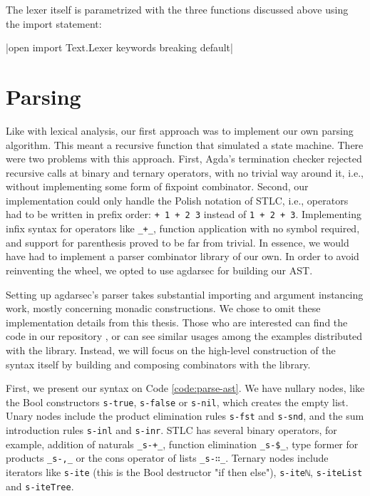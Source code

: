 The lexer itself is parametrized with the three functions discussed above using the import statement:

|open import Text.Lexer keywords breaking default|

\section{Parsing}

Like with lexical analysis, our first approach was to implement our own parsing algorithm. This meant a recursive function that simulated a state machine. There were two problems with this approach. First, Agda's termination checker rejected recursive calls at binary and ternary operators, with no trivial way around it, i.e., without implementing some form of fixpoint combinator. Second, our implementation could only handle the Polish notation of STLC, i.e., operators had to be written in prefix order: \verb$+ 1 + 2 3$ instead of \verb$1 + 2 + 3$. Implementing infix syntax for operators like \verb$_+_$, function application with no symbol required, and support for parenthesis proved to be far from trivial. In essence, we would have had to implement a parser combinator library of our own. In order to avoid reinventing the wheel, we opted to use agdarsec for building our AST.

Setting up agdarsec's parser takes substantial importing and argument instancing work, mostly concerning monadic constructions. We chose to omit these implementation details from this thesis. Those who are interested can find the code in our repository \cite{home-repo}, or can see similar usages among the examples distributed with the library. Instead, we will focus on the high-level construction of the syntax itself by building and composing combinators with the library.

First, we present our syntax on Code \ref{code:parse-ast}. We have nullary nodes, like the Bool constructors \verb$s-true$, \verb$s-false$ or \verb$s-nil$, which creates the empty list. Unary nodes include the product elimination rules \verb$s-fst$ and \verb$s-snd$, and the sum introduction rules \verb$s-inl$ and \verb$s-inr$. STLC has several binary operators, for example, addition of naturals \verb$_s-+_$, function elimination \verb$_s-$\verb=$=\verb$_$, type former for products \verb$_s-,_$ or the cons operator of lists \verb$_s-∷_$. Ternary nodes include iterators like \verb$s-ite$ (this is the Bool destructor "if then else"), \verb$s-iteℕ$, \verb$s-iteList$ and \verb$s-iteTree$.

